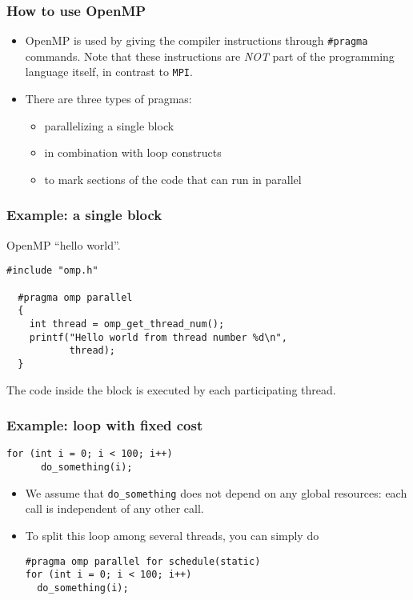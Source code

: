 \begin{frame}
  \frametitle{How to use OpenMP}
  \begin{itemize}
  \item OpenMP is used by giving the compiler instructions through
    \texttt{\#pragma} commands. Note that these instructions are \emph{NOT} part
    of the programming language itself, in contrast to \texttt{MPI}.
  \item There are three types of pragmas:
    \begin{itemize}
    \item parallelizing a single block
    \item in combination with loop constructs
    \item to mark sections of the code that can run in parallel
    \end{itemize}
  \end{itemize}
\end{frame}

\begin{frame}[fragile]
  \frametitle{Example: a single block}
  OpenMP ``hello world''.
\begin{lstlisting}[style=c]
  #include "omp.h"

  #pragma omp parallel
  {
    int thread = omp_get_thread_num();
    printf("Hello world from thread number %d\n",
           thread);
  }
\end{lstlisting}
  The code inside the block is executed by each participating thread.
\end{frame}

\begin{frame}[fragile]
  \frametitle{Example: loop with fixed cost}
  \begin{lstlisting}[style=c]
    for (int i = 0; i < 100; i++)
      do_something(i);
  \end{lstlisting}
  \begin{itemize}
  \item We assume that \texttt{do\_something} does not depend on any global
    resources: each call is independent of any other call.
  \item To split this loop among several threads, you can simply do
    \begin{lstlisting}[style=c]
#pragma omp parallel for schedule(static)
for (int i = 0; i < 100; i++)
  do_something(i);
    \end{lstlisting}
  \end{itemize}
\end{frame}

